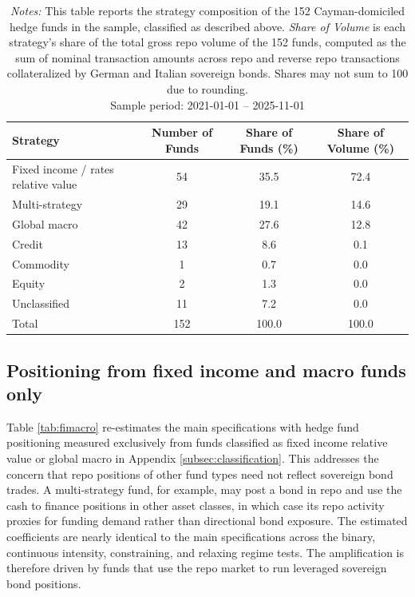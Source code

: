 \documentclass[english, 11pt, oneside]{article}
\begin{document}
\begin{table}[h!]
\centering
\caption{\textbf{Hedge Fund Strategy Composition}}
\footnotesize
\setlength{\tabcolsep}{8pt}
\renewcommand{\arraystretch}{1.1}
\begin{tabular}{l c c c}
\toprule
Strategy & Number of Funds & Share of Funds (\%) & Share of Volume (\%) \\
\midrule
Fixed income / rates relative value & 54 & 35.5 & 72.4 \\
Multi-strategy & 29 & 19.1 & 14.6 \\
Global macro & 42 & 27.6 & 12.8 \\
Credit & 13 & 8.6 & 0.1 \\
Commodity & 1 & 0.7 & 0.0 \\
Equity & 2 & 1.3 & 0.0 \\
Unclassified & 11 & 7.2 & 0.0 \\
\midrule
Total & 152 & 100.0 & 100.0 \\
\bottomrule
\end{tabular}
\label{tab:fund_classification}
\caption*{\textit{Notes:} This table reports the strategy composition of the 152 Cayman-domiciled hedge funds in the sample, classified as described above. \textit{Share of Volume} is each strategy's share of the total gross repo volume of the 152 funds, computed as the sum of nominal transaction amounts across repo and reverse repo transactions collateralized by German and Italian sovereign bonds. Shares may not sum to 100 due to rounding. \\ Sample period: 2021-01-01 -- 2025-11-01}
\end{table}

\clearpage
\subsection{Positioning from fixed income and macro funds only}
\label{subsec:fimacro}

Table \ref{tab:fimacro} re-estimates the main specifications with hedge fund positioning measured exclusively from funds classified as fixed income relative value or global macro in Appendix \ref{subsec:classification}. This addresses the concern that repo positions of other fund types need not reflect sovereign bond trades. A multi-strategy fund, for example, may post a bond in repo and use the cash to finance positions in other asset classes, in which case its repo activity proxies for funding demand rather than directional bond exposure. The estimated coefficients are nearly identical to the main specifications across the binary, continuous intensity, constraining, and relaxing regime tests. The amplification is therefore driven by funds that use the repo market to run leveraged sovereign bond positions. \\
\end{document}

